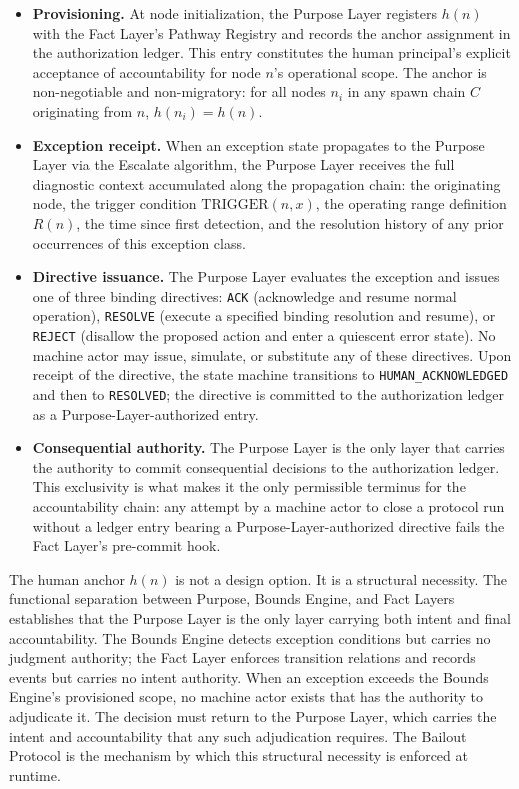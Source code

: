 \begin{itemize}\itemsep=0pt
\item[(\textit{i})] \textbf{Provisioning.} At node initialization, the Purpose Layer registers $h(n)$ with the Fact Layer's Pathway Registry and records the anchor assignment in the authorization ledger. This entry constitutes the human principal's explicit acceptance of accountability for node $n$'s operational scope. The anchor is non-negotiable and non-migratory: for all nodes $n_i$ in any spawn chain $C$ originating from $n$, $h(n_i) = h(n)$.

\item[(\textit{ii})] \textbf{Exception receipt.} When an exception state propagates to the Purpose Layer via the Escalate algorithm, the Purpose Layer receives the full diagnostic context accumulated along the propagation chain: the originating node, the trigger condition $\text{TRIGGER}(n, x)$, the operating range definition $R(n)$, the time since first detection, and the resolution history of any prior occurrences of this exception class.

\item[(\textit{iii})] \textbf{Directive issuance.} The Purpose Layer evaluates the exception and issues one of three binding directives: \texttt{ACK} (acknowledge and resume normal operation), \texttt{RESOLVE} (execute a specified binding resolution and resume), or \texttt{REJECT} (disallow the proposed action and enter a quiescent error state). No machine actor may issue, simulate, or substitute any of these directives. Upon receipt of the directive, the state machine transitions to \texttt{HUMAN\_ACKNOWLEDGED} and then to \texttt{RESOLVED}; the directive is committed to the authorization ledger as a Purpose-Layer-authorized entry.

\item[(\textit{iv})] \textbf{Consequential authority.} The Purpose Layer is the only layer that carries the authority to commit consequential decisions to the authorization ledger. This exclusivity is what makes it the only permissible terminus for the accountability chain: any attempt by a machine actor to close a protocol run without a ledger entry bearing a Purpose-Layer-authorized directive fails the Fact Layer's pre-commit hook.
\end{itemize}

The human anchor $h(n)$ is not a design option. It is a structural necessity. The functional separation between Purpose, Bounds Engine, and Fact Layers establishes that the Purpose Layer is the only layer carrying both intent and final accountability. The Bounds Engine detects exception conditions but carries no judgment authority; the Fact Layer enforces transition relations and records events but carries no intent authority. When an exception exceeds the Bounds Engine's provisioned scope, no machine actor exists that has the authority to adjudicate it. The decision must return to the Purpose Layer, which carries the intent and accountability that any such adjudication requires. The Bailout Protocol is the mechanism by which this structural necessity is enforced at runtime.

